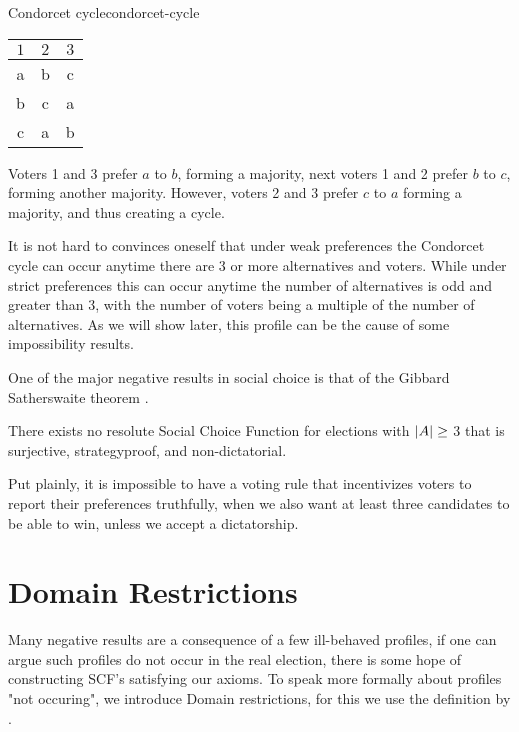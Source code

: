 \begin{example}{Condorcet cycle}{condorcet-cycle}
	\begin{minipage}{0.15\linewidth}
		\begin{tabular}{ccc}
			\toprule
			$1$ & $2$ & $3$ \\
			\midrule
			a   & b   & c   \\
			b   & c   & a   \\
			c   & a   & b   \\
			\bottomrule
		\end{tabular}
	\end{minipage}
	\hspace{0.02\linewidth}
	\begin{minipage}{0.78\linewidth}
		Voters 1 and 3  prefer $a$ to $b$, forming a majority, next voters 1 and 2 prefer $b$ to $c$, forming another majority. However, voters 2 and 3 prefer $c$ to $a$ forming a majority, and thus creating a cycle.
	\end{minipage}
\end{example}

It is not hard to convinces oneself that under weak preferences the Condorcet cycle can occur anytime there are 3 or more alternatives and voters. While under strict preferences this can occur anytime the number of alternatives is odd and greater than 3, with the number of voters being a multiple of the number of alternatives. As we will show later, this profile can be the cause of some impossibility results.

One of the major negative results in social choice is that of the Gibbard Satherswaite theorem \citep{gibbardManipulationVotingSchemes1973,satterthwaiteStrategyproofnessArrowsConditions1975}.

\begin{theorem}
	There exists no resolute Social Choice Function for elections with $|A| \geq$ 3 that is surjective, strategyproof, and non-dictatorial.
\end{theorem}

Put plainly, it is impossible to have a voting rule that incentivizes voters to
report their preferences truthfully, when we also want at least three
candidates to be able to win, unless we accept a dictatorship.

\section{Domain Restrictions}
\label{sec: Domain-res}
Many negative results are a consequence of a few ill-behaved profiles, if one can argue such profiles do not occur in the real election, there is some hope of constructing SCF's satisfying our axioms. To speak more formally about profiles "not occuring", we introduce Domain restrictions, for this we use the definition by \citet{elkindPreferenceRestrictionsComputational2022}.

